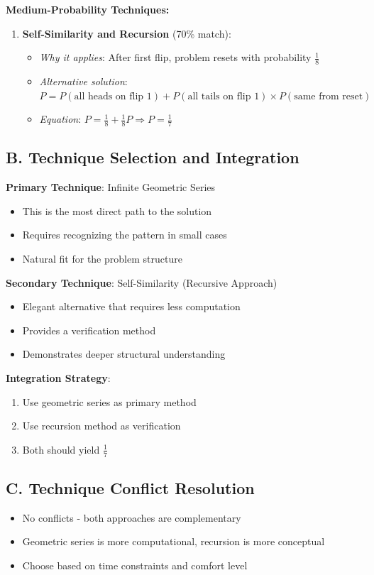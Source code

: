 \documentclass[11pt]{article}
\begin{document}
\begin{conversionbox}
\textbf{Medium-Probability Techniques:}
\begin{enumerate}[resume]
    \item \textbf{Self-Similarity and Recursion} (70\% match):
    \begin{itemize}
        \item \textit{Why it applies}: After first flip, problem resets with probability $\frac{1}{8}$
        \item \textit{Alternative solution}: $P = P(\text{all heads on flip 1}) + P(\text{all tails on flip 1}) \times P(\text{same from reset})$
        \item \textit{Equation}: $P = \frac{1}{8} + \frac{1}{8}P \Rightarrow P = \frac{1}{7}$
    \end{itemize}
\end{enumerate}

\subsection*{B. Technique Selection and Integration}

\textbf{Primary Technique}: Infinite Geometric Series
\begin{itemize}
    \item This is the most direct path to the solution
    \item Requires recognizing the pattern in small cases
    \item Natural fit for the problem structure
\end{itemize}

\textbf{Secondary Technique}: Self-Similarity (Recursive Approach)
\begin{itemize}
    \item Elegant alternative that requires less computation
    \item Provides a verification method
    \item Demonstrates deeper structural understanding
\end{itemize}

\textbf{Integration Strategy}:
\begin{enumerate}
    \item Use geometric series as primary method
    \item Use recursion method as verification
    \item Both should yield $\boxed{\frac{1}{7}}$
\end{enumerate}

\subsection*{C. Technique Conflict Resolution}
\begin{itemize}[leftmargin=*]
    \item No conflicts - both approaches are complementary
    \item Geometric series is more computational, recursion is more conceptual
    \item Choose based on time constraints and comfort level
\end{itemize}
\end{conversionbox}
\end{document}
